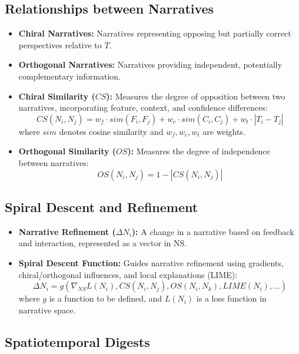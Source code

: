 \documentclass{article}
\begin{document}
\subsection{Relationships between Narratives}

\begin{itemize}
    \item \textbf{Chiral Narratives:} Narratives representing opposing but partially correct perspectives relative to $T$.
    \item \textbf{Orthogonal Narratives:} Narratives providing independent, potentially complementary information.
    \item \textbf{Chiral Similarity ($CS$): } Measures the degree of opposition between two narratives, incorporating feature, context, and confidence differences:
    \[ CS(N_i, N_j) = w_f \cdot sim(F_i, F_j) + w_c \cdot sim(C_i, C_j) + w_t \cdot |T_i - T_j| \]
    where $sim$ denotes cosine similarity and $w_f, w_c, w_t$ are weights.
    \item \textbf{Orthogonal Similarity ($OS$): } Measures the degree of independence between narratives:
    \[ OS(N_i, N_j) = 1 - |CS(N_i, N_j)| \]
\end{itemize}

\subsection{Spiral Descent and Refinement}

\begin{itemize}
    \item \textbf{Narrative Refinement ($\Delta N_i$): } A change in a narrative based on feedback and interaction, represented as a vector in NS.
    \item \textbf{Spiral Descent Function:} Guides narrative refinement using gradients, chiral/orthogonal influences, and local explanations (LIME):
    \[ \Delta N_i = g(\nabla_{NS} L(N_i), CS(N_i, N_j), OS(N_i, N_k), LIME(N_i), \dots) \]
    where $g$ is a function to be defined, and $L(N_i)$ is a loss function in narrative space.
\end{itemize}

\subsection{Spatiotemporal Digests}
\end{document}
